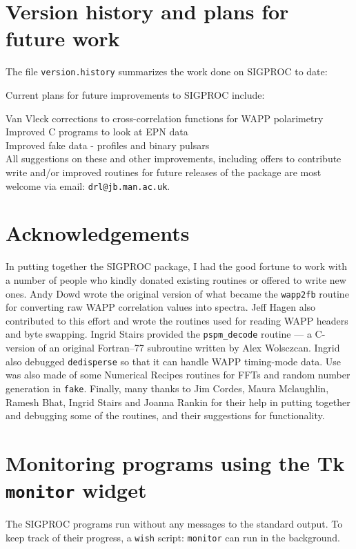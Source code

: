 \documentclass[11pt]{article}
\begin{document}
\section{Version history and plans for future work}
\label{past/future}
The file {\tt version.history} summarizes the work done
on SIGPROC to date:

Current plans for future improvements to SIGPROC include:

\noindent
Van Vleck corrections to cross-correlation functions for WAPP polarimetry\\
Improved C programs to look at EPN data\\
Improved fake data - profiles and binary pulsars\\

\noindent
All suggestions on these and other improvements, including
offers to contribute write and/or improved routines for future 
releases of the package are most welcome via email:
{\tt drl@jb.man.ac.uk}.

\section*{Acknowledgements}

In putting together the SIGPROC package, I had the good fortune to
work with a number of people who kindly donated existing routines or
offered to write new ones.  Andy Dowd wrote the original version of
what became the {\tt wapp2fb} routine for converting raw WAPP
correlation values into spectra. Jeff Hagen also contributed to this
effort and wrote the routines used for reading WAPP headers and byte
swapping. Ingrid Stairs provided the \verb+pspm_decode+ routine --- a
C-version of an original Fortran--77 subroutine written by Alex
Wolsczcan. Ingrid also debugged {\tt dedisperse} so that it can handle
WAPP timing-mode data.  Use was also made of some Numerical Recipes
routines for FFTs and random number generation in {\tt fake}. Finally,
many thanks to Jim Cordes, Maura Mclaughlin, Ramesh Bhat, Ingrid
Stairs and Joanna Rankin
for their help in putting together and debugging some of the
routines, and their suggestions for functionality.

\clearpage
\appendix
\section{Monitoring programs using the Tk {\tt monitor} widget}
\label{monitoring}
The SIGPROC programs run without any messages to the standard
output. To keep track of their progress, a {\tt wish} script:
{\tt monitor} can run in the background. 
\end{document}
